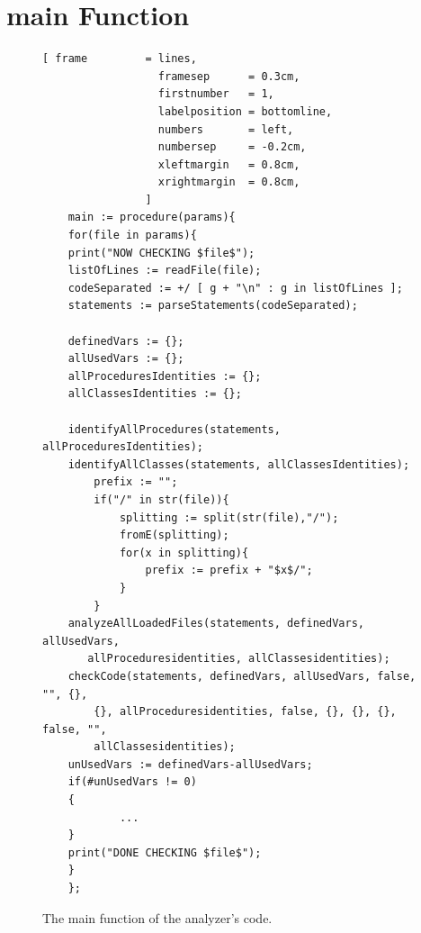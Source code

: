 \documentclass[11pt]{report}
\begin{document}
\section{main Function}

\begin{figure}[!htb]
\centering
\begin{Verbatim}[ frame         = lines, 
                  framesep      = 0.3cm, 
                  firstnumber   = 1,
                  labelposition = bottomline,
                  numbers       = left,
                  numbersep     = -0.2cm,
                  xleftmargin   = 0.8cm,
                  xrightmargin  = 0.8cm,
                ]
    main := procedure(params){
    for(file in params){
	print("NOW CHECKING $file$");
	listOfLines := readFile(file); 
	codeSeparated := +/ [ g + "\n" : g in listOfLines ];
	statements := parseStatements(codeSeparated);

	definedVars := {};
	allUsedVars := {};
	allProceduresIdentities := {};
	allClassesIdentities := {};
	
	identifyAllProcedures(statements, allProceduresIdentities);
	identifyAllClasses(statements, allClassesIdentities);
        prefix := "";
        if("/" in str(file)){
            splitting := split(str(file),"/");
            fromE(splitting);
            for(x in splitting){
                prefix := prefix + "$x$/";
            }
        }	
	analyzeAllLoadedFiles(statements, definedVars, allUsedVars,
	   allProceduresidentities, allClassesidentities);
	checkCode(statements, definedVars, allUsedVars, false, "", {},
	    {}, allProceduresidentities, false, {}, {}, {}, false, "", 
	    allClassesidentities);
	unUsedVars := definedVars-allUsedVars;
	if(#unUsedVars != 0)
	{
            ...
	}
	print("DONE CHECKING $file$");
    }
    };
\end{Verbatim}
\vspace*{-0.3cm}
\caption{The main function of the analyzer's code.}
\label{fig:startAnalyzing}
\end{figure}
\end{document}

